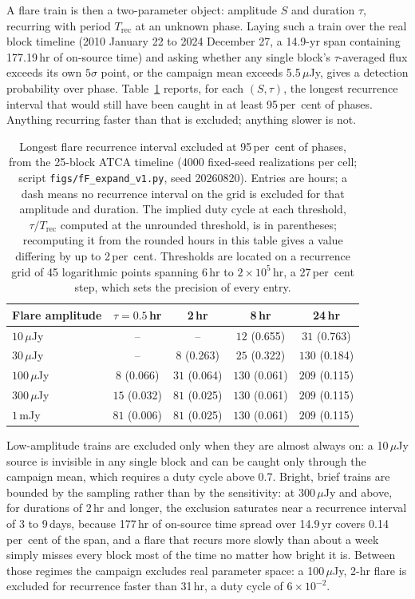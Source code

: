 \documentclass[11pt]{article}
\begin{document}
A flare train is then a two-parameter object: amplitude $S$ and duration $\tau$, recurring with period $T_{\mathrm{rec}}$ at an unknown phase. Laying such a train over the real block timeline (2010 January 22 to 2024 December 27, a 14.9-yr span containing 177.19\,hr of on-source time) and asking whether any single block's $\tau$-averaged flux exceeds its own $5\sigma$ point, or the campaign mean exceeds 5.5\,$\mu$Jy, gives a detection probability over phase. Table~\ref{tab:duty} reports, for each $(S, \tau)$, the longest recurrence interval that would still have been caught in at least 95\,per~cent of phases. Anything recurring faster than that is excluded; anything slower is not.

\begin{table}[tbp]
\centering
\small
\caption{Longest flare recurrence interval excluded at 95\,per~cent of phases,
from the 25-block ATCA timeline (4000 fixed-seed realizations per cell; script
\texttt{figs/fF\_expand\_v1.py}, seed 20260820). Entries are hours; a dash means
no recurrence interval on the grid is excluded for that amplitude and duration.
The implied duty cycle at each threshold, $\tau/T_{\mathrm{rec}}$ computed at the
unrounded threshold, is in parentheses; recomputing it from the rounded hours in
this table gives a value differing by up to 2\,per~cent. Thresholds are located
on a recurrence grid of 45 logarithmic points spanning 6\,hr to $2\times10^{5}$\,hr,
a 27\,per~cent step, which sets the precision of every entry.}
\label{tab:duty}
\begin{tabular}{lcccc}
\toprule
Flare amplitude & $\tau = 0.5$\,hr & 2\,hr & 8\,hr & 24\,hr \\
\midrule
$10\,\mu$Jy & -- & -- & $12$ (0.655) & $31$ (0.763) \\
$30\,\mu$Jy & -- & $8$ (0.263) & $25$ (0.322) & $130$ (0.184) \\
$100\,\mu$Jy & $8$ (0.066) & $31$ (0.064) & $130$ (0.061) & $209$ (0.115) \\
$300\,\mu$Jy & $15$ (0.032) & $81$ (0.025) & $130$ (0.061) & $209$ (0.115) \\
$1$\,mJy & $81$ (0.006) & $81$ (0.025) & $130$ (0.061) & $209$ (0.115) \\
\bottomrule
\end{tabular}
\end{table}

Low-amplitude trains are excluded only when they are almost always on: a 10\,$\mu$Jy source is invisible in any single block and can be caught only through the campaign mean, which requires a duty cycle above 0.7. Bright, brief trains are bounded by the sampling rather than by the sensitivity: at 300\,$\mu$Jy and above, for durations of 2\,hr and longer, the exclusion saturates near a recurrence interval of 3 to 9\,days, because 177\,hr of on-source time spread over 14.9\,yr covers 0.14\,per~cent of the span, and a flare that recurs more slowly than about a week simply misses every block most of the time no matter how bright it is. Between those regimes the campaign excludes real parameter space: a 100\,$\mu$Jy, 2-hr flare is excluded for recurrence faster than 31\,hr, a duty cycle of $6\times10^{-2}$.
\end{document}
